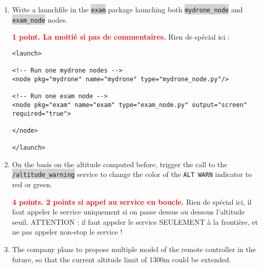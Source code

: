 \documentclass[10pt,a4paper,english]{exam}
\newcounter{mainmemorder}
\newcommand{\load}{\setcounter{enumi}{\value{mainmemorder}}}
\newcommand{\mytext}[1]{\colorbox{lightgray}{\texttt{#1}}}
\begin{document}
\begin{enumerate}
	\load
	\item Write a launchfile in the \mytext{exam} package launching both
	      \mytext{mydrone\_node} and \mytext{exam\_node} nodes.
	      \begin{solution}\textbf{\textcolor{red}{1 point. La moitié si pas de commentaires.}}
		      Rien de spécial ici :
		      \begin{verbatim}
<launch>

<!-- Run one mydrone nodes -->
<node pkg="mydrone" name="mydrone" type="mydrone_node.py"/>

<!-- Run one exam node -->
<node pkg="exam" name="exam" type="exam_node.py" output="screen" required="true">

</node>

</launch>			
		\end{verbatim}
	      \end{solution}
	\item On the basis on the altitude computed before, trigger the call to the
	      \mytext{/altitude\_warning} service to change the color of the \texttt{ALT WARN} indicator
	      to red or green.
	      \begin{solution}
		      \textbf{\textcolor{red}{4 points. 2 points si appel au service en boucle.}}
		      Rien de spécial ici, il faut appeler le service uniquement si on passe dessus ou dessous
		      l'altitude seuil. ATTENTION : il faut appeler le service SEULEMENT à la frontière, et ne
		      pas appeler non-stop le service !
	      \end{solution}
	\item The company plans to propose multiple model of the remote controller in the future, so
	      that the current altitude limit of 1300m could be extended.


\end{enumerate}
\end{document}
